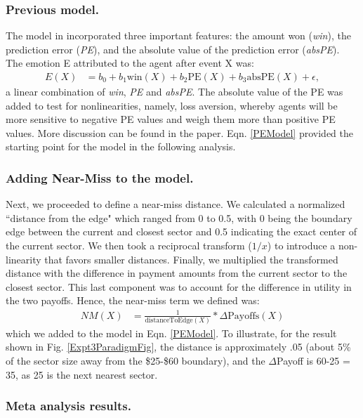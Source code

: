 \documentclass[10pt,letterpaper]{article}
\begin{document}
\subsubsection{Previous model.} The model in  incorporated three important features: the amount won (\textit{win}), the prediction error (\textit{PE}), and the absolute value of the prediction error (\textit{absPE}). The emotion E attributed to the agent after event X was:
\begin{align}
E(X) &= b_0 + b_1 \text{win}(X) + b_2 \text{PE}(X) + b_3 \text{absPE}(X) + \epsilon \label{PEModel},
\end{align}
a linear combination of \textit{win}, \textit{PE} and \textit{absPE}. The absolute value of the PE was added to test for nonlinearities, namely, loss aversion, whereby agents will be more sensitive to negative PE values and weigh them more than positive PE values. More discussion can be found in the paper. Eqn. \ref{PEModel} provided the starting point for the model in the following analysis.


\subsubsection{Adding Near-Miss to the model.}

Next, we proceeded to define a near-miss distance. We calculated a normalized ``distance from the edge" which ranged from 0 to 0.5, with 0 being the boundary edge between the current and closest sector and 0.5 indicating the exact center of the current sector. We then took a reciprocal transform ($1/x$) to introduce a non-linearity that favors smaller distances. Finally, we multiplied the transformed distance with the difference in payment amounts from the current sector to the closest sector. This last component was to account for the difference in utility in the two payoffs. Hence, the near-miss term we defined was:
\begin{align}
NM(X) &= \frac{1}{\text{distanceToEdge}(X)} * \Delta\text{Payoffs}(X) \label{NMRegressor}
\end{align}
which we added to the model in Eqn. \ref{PEModel}. To illustrate, for the result shown in Fig. \ref{Expt3ParadigmFig}, the distance is approximately .05 (about 5\% of the sector size away from the \$25-\$60 boundary), and the $\Delta$Payoff is 60-25 = 35, as 25 is the next nearest sector.

\subsubsection{Meta analysis results.}
\end{document}

